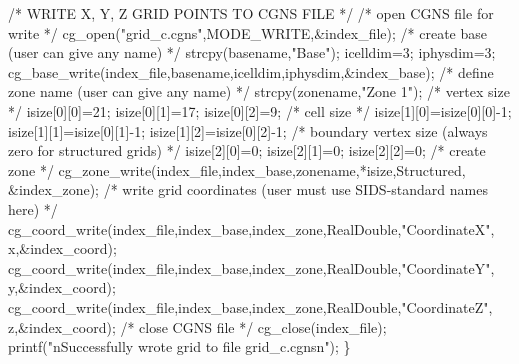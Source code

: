 \documentclass[12pt]{article}
\begin{document}
{\noindent /*  WRITE X, Y, Z GRID POINTS TO CGNS FILE  */
\newline /*  open CGNS file for write  */
\newline\indent  cg\_open("grid\_c.cgns",MODE\_WRITE,\&index\_file);
\newline /*  create base (user can give any name)  */
\newline\indent  strcpy(basename,"Base");
\newline\indent  icelldim=3;
\newline\indent  iphysdim=3;
\newline\indent  cg\_base\_write(index\_file,basename,icelldim,iphysdim,\&index\_base);
\newline /*  define zone name (user can give any name)  */
\newline\indent  strcpy(zonename,"Zone  1");
\newline /*  vertex size  */
\newline\indent  isize[0][0]=21;
\newline\indent  isize[0][1]=17;
\newline\indent  isize[0][2]=9;
\newline /*  cell size  */
\newline\indent  isize[1][0]=isize[0][0]-1;
\newline\indent  isize[1][1]=isize[0][1]-1;
\newline\indent  isize[1][2]=isize[0][2]-1;
\newline /*  boundary vertex size (always zero for structured grids)  */
\newline\indent  isize[2][0]=0;
\newline\indent  isize[2][1]=0;
\newline\indent  isize[2][2]=0;
\newline /*  create zone  */
\newline\indent  cg\_zone\_write(index\_file,index\_base,zonename,*isize,Structured,
\newline \indent \indent \&index\_zone);
\newline /*  write grid coordinates (user must use SIDS-standard names here)  */
\newline\indent  cg\_coord\_write(index\_file,index\_base,index\_zone,RealDouble,"CoordinateX",
\newline \indent \indent x,\&index\_coord);
\newline\indent  cg\_coord\_write(index\_file,index\_base,index\_zone,RealDouble,"CoordinateY",
\newline \indent \indent y,\&index\_coord);
\newline\indent  cg\_coord\_write(index\_file,index\_base,index\_zone,RealDouble,"CoordinateZ",
\newline \indent \indent z,\&index\_coord);
\newline /*  close CGNS file  */
\newline\indent  cg\_close(index\_file);
\newline\indent printf("\texttt{}nSuccessfully wrote grid to file grid\_c.cgns\texttt{}n");
\newline\}
}
\end{document}
